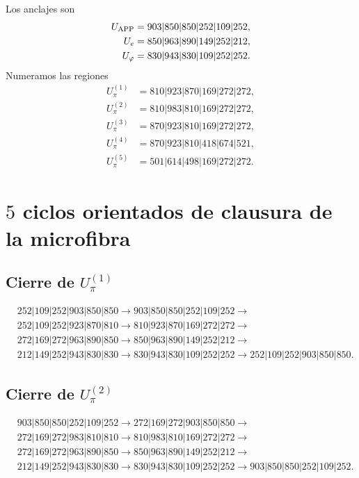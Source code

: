 Los anclajes son
\[
\begin{aligned}
U_{\rm APP}&=903|850|850|252|109|252,\\
U_e&=850|963|890|149|252|212,\\
U_\varphi&=830|943|830|109|252|252.
\end{aligned}
\]
Numeramos las regiones
\[
\begin{aligned}
U_\pi^{(1)}&=810|923|870|169|272|272,\\
U_\pi^{(2)}&=810|983|810|169|272|272,\\
U_\pi^{(3)}&=870|923|810|169|272|272,\\
U_\pi^{(4)}&=870|923|810|418|674|521,\\
U_\pi^{(5)}&=501|614|498|169|272|272.
\end{aligned}
\]

\section{\(5\) ciclos orientados de clausura de la microfibra}

\subsection{Cierre de \texorpdfstring{\(U_\pi^{(1)}\)}{U-pi 1}}
\begin{align*}
&252|109|252|903|850|850\to
903|850|850|252|109|252\to\\
&252|109|252|923|870|810\to
810|923|870|169|272|272\to\\
&272|169|272|963|890|850\to
850|963|890|149|252|212\to\\
&212|149|252|943|830|830\to
830|943|830|109|252|252\to
252|109|252|903|850|850.
\end{align*}

\subsection{Cierre de \texorpdfstring{\(U_\pi^{(2)}\)}{U-pi 2}}
\begin{align*}
&903|850|850|252|109|252\to
272|169|272|903|850|850\to\\
&272|169|272|983|810|810\to
810|983|810|169|272|272\to\\
&272|169|272|963|890|850\to
850|963|890|149|252|212\to\\
&212|149|252|943|830|830\to
830|943|830|109|252|252\to
903|850|850|252|109|252.
\end{align*}

